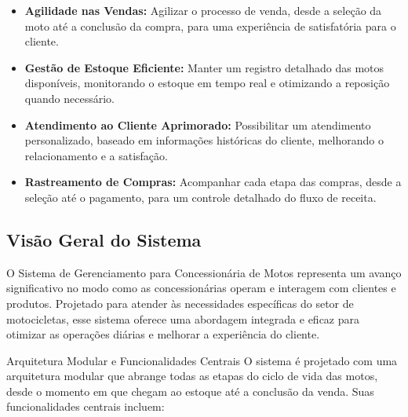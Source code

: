 		\begin{itemize}
			\item \textbf{Agilidade nas Vendas:}  Agilizar o processo de venda, desde a seleção da moto até a conclusão da compra, para uma experiência de satisfatória para o cliente.
			
			\item \textbf{Gestão de Estoque Eficiente:} Manter um registro detalhado das motos disponíveis, monitorando o estoque em tempo real e otimizando a reposição quando necessário.
			
			\item \textbf{Atendimento ao Cliente Aprimorado:} Possibilitar um atendimento personalizado, baseado em informações históricas do cliente, melhorando o relacionamento e a satisfação.
			
			\item \textbf{Rastreamento de Compras:} Acompanhar cada etapa das compras, desde a seleção até o pagamento, para um controle detalhado do fluxo de receita.
			
		\end{itemize}
		 
        \subsection{Visão Geral do Sistema}
        O Sistema de Gerenciamento para Concessionária de Motos representa um avanço significativo no modo como as concessionárias operam e interagem com clientes e produtos. Projetado para atender às necessidades específicas do setor de motocicletas, esse sistema oferece uma abordagem integrada e eficaz para otimizar as operações diárias e melhorar a experiência do cliente.
        
        Arquitetura Modular e Funcionalidades Centrais
        O sistema é projetado com uma arquitetura modular que abrange todas as etapas do ciclo de vida das motos, desde o momento em que chegam ao estoque até a conclusão da venda. Suas funcionalidades centrais incluem:
        
